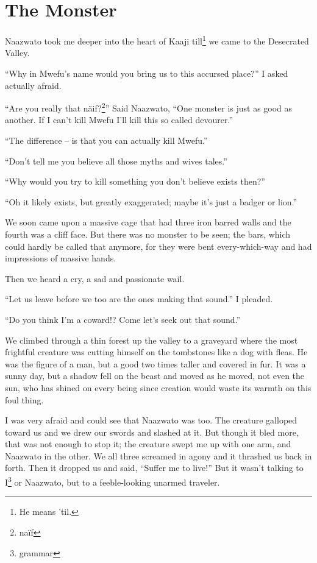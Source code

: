 \chapter{The Monster}
Naazwato took me deeper into the heart of Kaaji till\footnote{He means 'til.} we came to the Desecrated Valley.

``Why in Mwefu's name would you bring us to this accursed place?'' I asked actually afraid.

``Are you really that n{\"a}if?\footnote{na{\"i}f}'' Said Naazwato, ``One monster is just as good as another. If I can't kill Mwefu I'll kill this so called devourer.''

``The difference -- is that you can actually kill Mwefu.''

``Don't tell me you believe all those myths and wives tales.''

``Why would you try to kill something you don't believe exists then?''

``Oh it likely exists, but greatly exaggerated; maybe it's just a badger or lion.''

We soon came upon a massive cage that had three iron barred walls and the fourth was a cliff face. But there was no monster to be seen; the bars, which could hardly be called that anymore, for they were bent every-which-way and had impressions of massive hands.

Then we heard a cry, a sad and passionate wail.

``Let us leave before we too are the ones making that sound.'' I pleaded.

``Do you think I'm a coward!? Come let's seek out that sound.''

We climbed through a thin forest up the valley to a graveyard where the most frightful creature was cutting himself on the tombstones like a dog with fleas.
He was the figure of a man, but a good two times taller and covered in fur.
It was a sunny day, but a shadow fell on the beast and moved as he moved, not even the sun, who has shined on every being since creation would waste its warmth on this foul thing.

I was very afraid and could see that Naazwato was too. The creature galloped toward us and we drew our swords and slashed at it. But though it bled more, that was not enough to stop it; the creature swept me up with one arm, and Naazwato in the other. We all three screamed in agony and it thrashed us back in forth.
Then it dropped us and said, ``Suffer me to live!'' But it wasn't talking to I\footnote{grammar} or Naazwato, but to a feeble-looking unarmed traveler.

